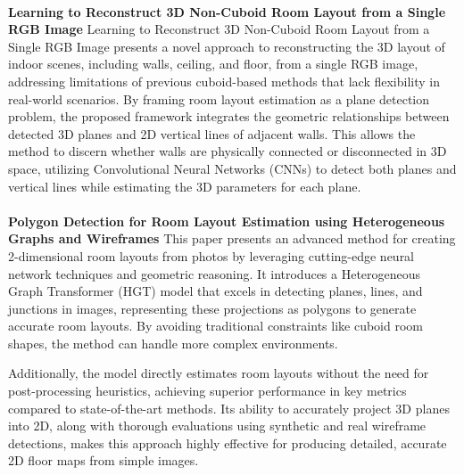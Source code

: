 \paragraph{}

\textbf{Learning to Reconstruct 3D Non-Cuboid Room Layout from a Single RGB Image} Learning to Reconstruct 3D Non-Cuboid Room Layout from a Single RGB Image\cite{9707088} presents a novel approach to reconstructing the 3D layout of indoor scenes, including walls, ceiling, and floor, from a single RGB image, addressing limitations of previous cuboid-based methods that lack flexibility in real-world scenarios. By framing room layout estimation as a plane detection problem, the proposed framework integrates the geometric relationships between detected 3D planes and 2D vertical lines of adjacent walls. This allows the method to discern whether walls are physically connected or disconnected in 3D space, utilizing Convolutional Neural Networks (CNNs) to detect both planes and vertical lines while estimating the 3D parameters for each plane.

\paragraph{}

\textbf{Polygon Detection for Room Layout Estimation using Heterogeneous Graphs and Wireframes}
This paper \cite{10350607} presents an advanced method for creating 2-dimensional room layouts from photos by leveraging cutting-edge neural network techniques and geometric reasoning. 
It introduces a Heterogeneous Graph Transformer (HGT) model that excels in detecting planes, lines, and junctions in images, representing these projections as polygons to generate accurate room layouts. 
By avoiding traditional constraints like cuboid room shapes, the method can handle more complex environments. 

Additionally, the model directly estimates room layouts without the need for post-processing heuristics, achieving superior performance in key metrics compared to state-of-the-art methods. 
Its ability to accurately project 3D planes into 2D, along with thorough evaluations using synthetic and real wireframe detections, makes this approach highly effective for producing detailed, accurate 2D floor maps from simple images.

\paragraph{}

